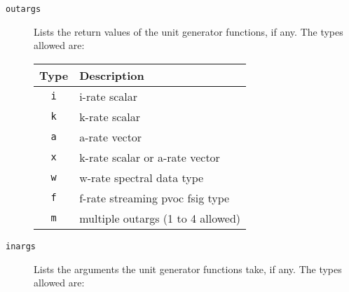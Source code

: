 \documentclass[10pt,letterpaper,onecolumn]{book}
\begin{document}
\begin{description}
	\item[\texttt{outargs}] Lists the return values of the unit generator functions, if any.  The types allowed are:

			\begin{center}
			\begin{tabular*}{280pt}[t]{cl}
			Type & Description \\
			\hline
			\texttt{i} & i-rate scalar \\
			\texttt{k} & k-rate scalar \\
			\texttt{a} & a-rate vector \\
			\texttt{x} & k-rate scalar or a-rate vector \\
			\texttt{w} & w-rate spectral data type \\
			\texttt{f} & f-rate streaming pvoc fsig type \\
			\texttt{m} & multiple outargs (1 to 4 allowed) \\
			\end{tabular*}
			\end{center}
					
	\item[\texttt{inargs}] Lists the arguments the unit generator functions take, if any.  The types allowed are: 


\end{description}
\end{document}
